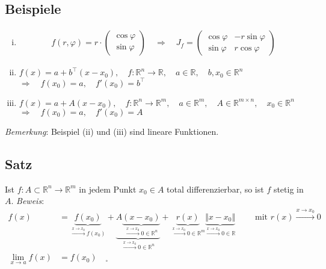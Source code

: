 \documentclass[11pt,a4paper]{book}
\newcommand {\R}	{\mathbb{R}}
\newcommand {\Rn}	{\mathbb{R}^n}
\newcommand {\Rm}	{\mathbb{R}^m}
\newcommand {\Rmxn}	{\mathbb{R}^{m \times n}}
\newcommand{\1}    	{\mathbbm{1}}
\newcommand{\mitt}	{\textrm{ mit }}
\begin{document}
\subsection{Beispiele}
\begin{enumerate}[(i)]
	\item \begin{align*}
		f(r,\varphi) = r \cdot \left( \begin{array}{c} \cos \varphi \\ \sin \varphi \end{array} \right) \quad \Rightarrow \quad J_f = \left( \begin{array}{cc}
			\cos \varphi & -r \sin \varphi \\
			\sin \varphi & r \cos \varphi
		\end{array} \right)
	\end{align*}
	\item \(f(x) = a + b^\top(x - x_0), \quad f : \Rn \rightarrow \R, \quad a \in \R, \quad b,x_0 \in \Rn\) \\
	\(\Rightarrow \quad f(x_0) = a, \quad f'(x_0) = b^\top \)
	\item \(f(x) = a + A(x - x_0), \quad f : \Rn \rightarrow \Rm, \quad a \in \Rm, \quad A \in \Rmxn, \quad x_0 \in \Rn\) \\
	\(\Rightarrow \quad f(x_0) = a, \quad f'(x_0) = A \)
\end{enumerate}
\textit{Bemerkung}: Beispiel (ii) und (iii) sind lineare Funktionen.

\subsection{Satz}
Ist \(f : A \subset \Rn \rightarrow \Rm\) in jedem Punkt \(x_0 \in A\) total differenzierbar, so ist \(f\) stetig in \(A\).
\textit{Beweis}:
\begin{align*}
	f(x) &= \underbrace{f(x_0)}_{\stackrel{x \rightarrow x_0}{\rightarrow} f(x_0)} + 
	\underbrace{A \underbrace{(x-x_0)}_{\stackrel{x \rightarrow x_0}{\rightarrow} 0 \in \Rn}}_{\stackrel{x \rightarrow x_0}{\rightarrow} 0 \in \Rn} + 
	\underbrace{r(x)}_{\stackrel{x \rightarrow x_0}{\rightarrow} 0 \in \Rm} 
	\underbrace{\Vert x - x_0 \Vert}_{\stackrel{x \rightarrow x_0}{\rightarrow} 0 \in \R}
	\qquad \mitt r(x) \stackrel{x \rightarrow x_0}{\rightarrow} 0 \\
	\lim_{x \rightarrow a} f(x) &= f(x_0) \quad _\square\\
\end{align*}
\end{document}
